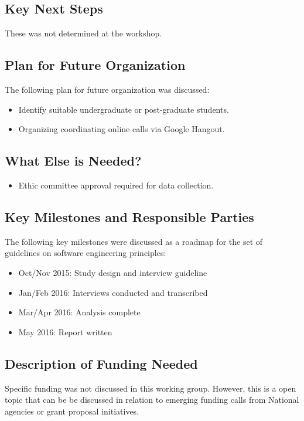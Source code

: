 \subsection{Key Next Steps}
These was not determined at the workshop. 

\subsection{Plan for Future Organization}
The following plan for future organization was discussed:
\begin{itemize}
\item Identify suitable undergraduate or post-graduate students.
\item Organizing coordinating online calls via Google Hangout.
\end{itemize}

\subsection{What Else is Needed?}

\begin{itemize}
\item Ethic committee approval required for data collection.
\end{itemize}

\subsection{Key Milestones and Responsible Parties}
The following key milestones were discussed as a roadmap for the set of guidelines on software engineering principles:
\begin{itemize}
\item Oct/Nov 2015: Study design and interview guideline
\item Jan/Feb 2016: Interviews conducted and transcribed
\item Mar/Apr 2016: Analysis complete
\item May 2016: Report written
\end{itemize}

\subsection{Description of Funding Needed}
Specific funding was not discussed in this working group. However, this is a open topic that can be be discussed in relation to emerging funding calls from National agencies or grant proposal initiatives.
